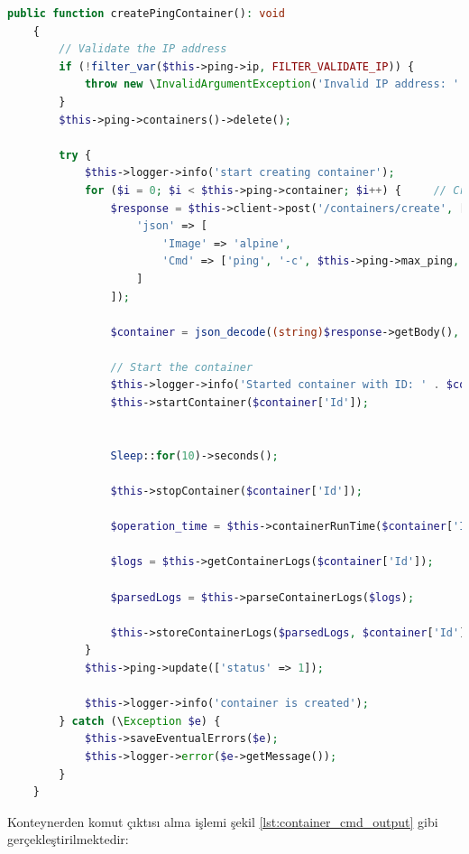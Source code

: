 \begin{lstlisting}[language=PHP, caption={Ping görevi servis metodu}, label={lst:ping_func}]
	public function createPingContainer(): void
    {
        // Validate the IP address
        if (!filter_var($this->ping->ip, FILTER_VALIDATE_IP)) {
            throw new \InvalidArgumentException('Invalid IP address: ' . $this->ping->ip);
        }
        $this->ping->containers()->delete();
        
        try {
            $this->logger->info('start creating container');
            for ($i = 0; $i < $this->ping->container; $i++) {     // Create the container
                $response = $this->client->post('/containers/create', [
                    'json' => [
                        'Image' => 'alpine',
                        'Cmd' => ['ping', '-c', $this->ping->max_ping, $this->ping->ip]
                    ]
                ]);
                
                $container = json_decode((string)$response->getBody(), true);
                
                // Start the container
                $this->logger->info('Started container with ID: ' . $container['Id']);
                $this->startContainer($container['Id']);
                
                
                Sleep::for(10)->seconds();
                
                $this->stopContainer($container['Id']);
                
                $operation_time = $this->containerRunTime($container['Id']);
                
                $logs = $this->getContainerLogs($container['Id']);
                
                $parsedLogs = $this->parseContainerLogs($logs);
                
                $this->storeContainerLogs($parsedLogs, $container['Id'], $operation_time);
            }
            $this->ping->update(['status' => 1]);
            
            $this->logger->info('container is created');
        } catch (\Exception $e) {
            $this->saveEventualErrors($e);
            $this->logger->error($e->getMessage());
        }
    }
	\end{lstlisting}
Konteynerden komut çıktısı alma işlemi şekil \ref{lst:container_cmd_output} gibi gerçekleştirilmektedir:

